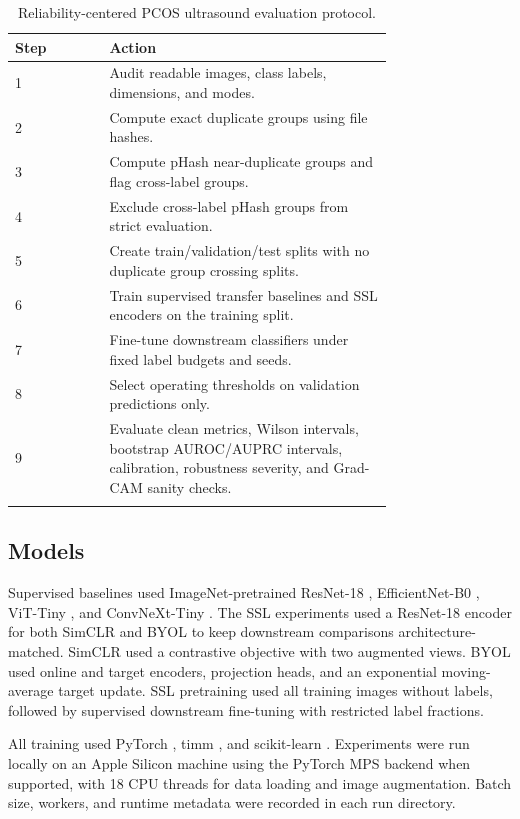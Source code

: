 \documentclass[pdflatex,sn-mathphys-num]{sn-jnl}
\theoremstyle{thmstyleone}
\theoremstyle{thmstyletwo}
\theoremstyle{thmstylethree}
\begin{document}
\begin{table}[h]
\caption{Reliability-centered PCOS ultrasound evaluation protocol.}\label{tab:protocol}
\begin{tabular}{@{}lp{0.75\linewidth}@{}}
\toprule
Step & Action \\
\midrule
1 & Audit readable images, class labels, dimensions, and modes. \\
2 & Compute exact duplicate groups using file hashes. \\
3 & Compute pHash near-duplicate groups and flag cross-label groups. \\
4 & Exclude cross-label pHash groups from strict evaluation. \\
5 & Create train/validation/test splits with no duplicate group crossing splits. \\
6 & Train supervised transfer baselines and SSL encoders on the training split. \\
7 & Fine-tune downstream classifiers under fixed label budgets and seeds. \\
8 & Select operating thresholds on validation predictions only. \\
9 & Evaluate clean metrics, Wilson intervals, bootstrap AUROC/AUPRC intervals, calibration, robustness severity, and Grad-CAM sanity checks. \\
\botrule
\end{tabular}
\end{table}

\subsection{Models}\label{subsec:models}

Supervised baselines used ImageNet-pretrained ResNet-18 \cite{he2016resnet}, EfficientNet-B0 \cite{tan2019efficientnet}, ViT-Tiny \cite{dosovitskiy2021vit}, and ConvNeXt-Tiny \cite{liu2022convnext}. The SSL experiments used a ResNet-18 encoder for both SimCLR \cite{chen2020simclr} and BYOL \cite{grill2020byol} to keep downstream comparisons architecture-matched. SimCLR used a contrastive objective with two augmented views. BYOL used online and target encoders, projection heads, and an exponential moving-average target update. SSL pretraining used all training images without labels, followed by supervised downstream fine-tuning with restricted label fractions.

All training used PyTorch \cite{paszke2019pytorch}, timm \cite{timm}, and scikit-learn \cite{scikit-learn}. Experiments were run locally on an Apple Silicon machine using the PyTorch MPS backend when supported, with 18 CPU threads for data loading and image augmentation. Batch size, workers, and runtime metadata were recorded in each run directory.
\end{document}
